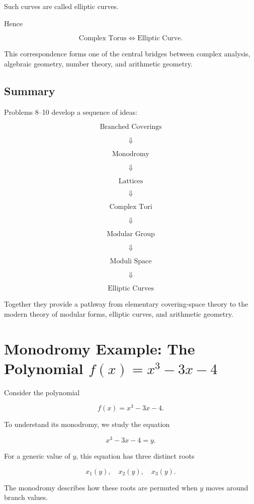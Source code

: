 \documentclass[12pt,a4paper]{article}
\theoremstyle{notespace}
\begin{document}
Such curves are called elliptic curves.

Hence

\[
\boxed{
	\text{Complex Torus}
	\Longleftrightarrow
	\text{Elliptic Curve}.
}
\]

This correspondence forms one of the central bridges between complex
analysis, algebraic geometry, number theory, and arithmetic geometry.

\subsection{Summary}

Problems 8--10 develop a sequence of ideas:

\[
\boxed{
	\text{Branched Coverings}
}
\]

\[
\Downarrow
\]

\[
\boxed{
	\text{Monodromy}
}
\]

\[
\Downarrow
\]

\[
\boxed{
	\text{Lattices}
}
\]

\[
\Downarrow
\]

\[
\boxed{
	\text{Complex Tori}
}
\]

\[
\Downarrow
\]

\[
\boxed{
	\text{Modular Group}
}
\]

\[
\Downarrow
\]

\[
\boxed{
	\text{Moduli Space}
}
\]

\[
\Downarrow
\]

\[
\boxed{
	\text{Elliptic Curves}
}
\]

Together they provide a pathway from elementary covering-space theory to
the modern theory of modular forms, elliptic curves, and arithmetic
geometry.

\section{Monodromy Example: The Polynomial \texorpdfstring{$f(x)=x^3-3x-4$}{f(x)=x3-3x-4}}

Consider the polynomial

\[
f(x)=x^3-3x-4.
\]

To understand its monodromy, we study the equation

\[
x^3-3x-4=y.
\]

For a generic value of \(y\), this equation has three distinct roots

\[
x_1(y),\quad x_2(y),\quad x_3(y).
\]

The monodromy describes how these roots are permuted when \(y\) moves
around branch values.
\end{document}
